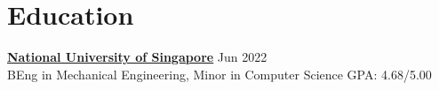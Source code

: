 \documentclass[11pt]{article}       %
\begin{document}
\vspace{-18.5pt}

\section*{Education}
\textbf{\href{https://nus.edu.sg/}{National University of Singapore}} \hfill Jun 2022 \\
BEng in Mechanical Engineering, Minor in Computer Science \hfill GPA: 4.68/5.00
\end{document}
